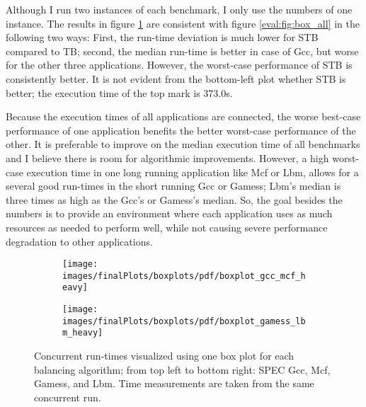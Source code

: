 Although I run two instances of each benchmark, I only use the numbers of one
instance.
The results in figure \ref{eval:fig:box_heavy} are consistent with figure
\ref{eval:fig:box_all} in the following two ways:
First, the run-time deviation is much lower for STB compared to TB;
second, the median run-time is better in case of Gcc, but worse for the other
three applications.
However, the worst-case performance of STB is consistently better.
It is not evident from the bottom-left plot whether STB is better; the
execution time of the top mark is $373.0$s.

Because the execution times of all applications are connected, the worse
best-case performance of one application benefits the better worst-case
performance of the other.
It is preferable to improve on the median execution time of all benchmarks and
I believe there is room for algorithmic improvements.
However, a high worst-case execution time in one long running application like
Mcf or Lbm, allows for a
several good run-times in the short running Gcc or Gamess; Lbm's median is
three times as high as the Gcc's or Gamess's median.
So, the goal besides the numbers is to provide an environment where each
application uses as much resources as needed to perform well, while not causing
severe performance degradation to other applications.
\\

\begin{figure}[h!]
  \begin{subfigure}{\textwidth}
  \texttt{[image: images/finalPlots/boxplots/pdf/boxplot\_gcc\_mcf\_heavy]}
  \end{subfigure}
  \begin{subfigure}{\textwidth}
  \texttt{[image: images/finalPlots/boxplots/pdf/boxplot\_gamess\_lbm\_heavy]}
  \end{subfigure}
  \caption{Concurrent run-times visualized using one box plot for each balancing
    algorithm; from top left to bottom right: SPEC Gcc, Mcf, Gamess, and Lbm.
    Time measurements are taken from the same concurrent run.}
    \label{eval:fig:box_heavy}
\end{figure}

